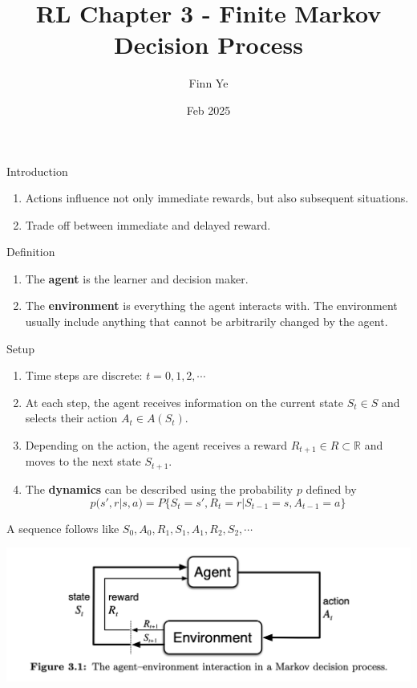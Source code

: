\documentclass{beamer}
\title{RL Chapter 3 - Finite Markov Decision Process}
\author{Finn Ye}
\date{Feb 2025}
\newcommand{\RR}{\mathbb{R}}
\begin{document}
\frame{\titlepage}

\begin{frame}{Introduction}
\begin{enumerate}
    \item Actions influence not only immediate rewards, but also subsequent situations.
    \item Trade off between immediate and delayed reward.
\end{enumerate}
\end{frame}

\begin{frame}{Definition}
\begin{enumerate}
    \item The \textbf{agent} is the learner and decision maker.
    \item The \textbf{environment} is everything the agent interacts with. The environment usually include anything that cannot be arbitrarily changed by the agent.
\end{enumerate}
\end{frame}

\begin{frame}{Setup}
    \begin{enumerate}
        \item Time steps are discrete: $t=0,1,2,\cdots$
        \item At each step, the agent receives information on the current state $S_t\in S$ and selects their action $A_t \in A(S_t)$.
        \item Depending on the action, the agent receives a reward $R_{t+1}\in R\subset\RR$ and moves to the next state $S_{t+1}$.
        \item The \textbf{dynamics} can be described using the probability $p$ defined by
        \[
        p(s',r|s,a)=P\{S_t = s', R_t = r|S_{t-1}=s,A_{t-1}=a\}
        \]
    \end{enumerate}

    A sequence follows like $S_0,A_0,R_1,S_1,A_1,R_2,S_2,\cdots$
    
    \begin{minipage}{\linewidth}
    \centering
    \includegraphics[width=0.8\linewidth]{F31.png}
    \end{minipage}
\end{frame}
\end{document}
